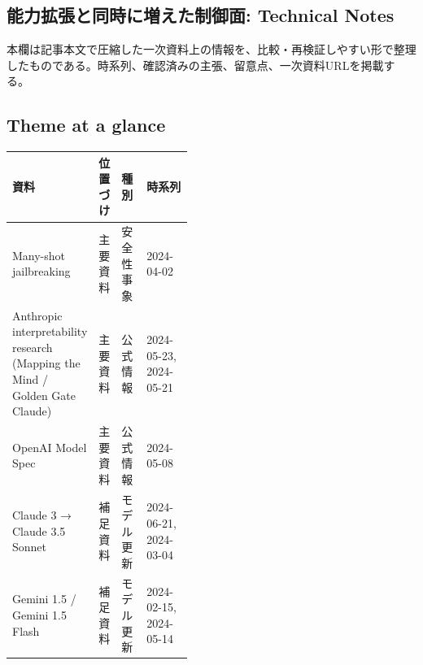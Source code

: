 \subsection*{能力拡張と同時に増えた制御面: Technical Notes}
本欄は記事本文で圧縮した一次資料上の情報を、比較・再検証しやすい形で整理したものである。時系列、確認済みの主張、留意点、一次資料URLを掲載する。
\smallskip
{}\par
\medskip
\subsection*{Theme at a glance}
\begin{center}
\footnotesize
\begin{tabularx}{\linewidth}{@{}p{0.20\linewidth}p{0.10\linewidth}p{0.14\linewidth}X@{}}
\toprule
資料 & 位置づけ & 種別 & 時系列 \\
\midrule
Many-shot jailbreaking & 主要資料 & 安全性事象 & 2024-04-02     \\
Anthropic interpretability research (Mapping the Mind / Golden Gate Claude) & 主要資料 & 公式情報 & 2024-05-23, 2024-05-21     \\
OpenAI Model Spec & 主要資料 & 公式情報 & 2024-05-08     \\
Claude 3 → Claude 3.5 Sonnet & 補足資料 & モデル更新 & 2024-06-21, 2024-03-04     \\
Gemini 1.5 / Gemini 1.5 Flash & 補足資料 & モデル更新 & 2024-02-15, 2024-05-14     \\
\bottomrule
\end{tabularx}
\end{center}
\normalsize

